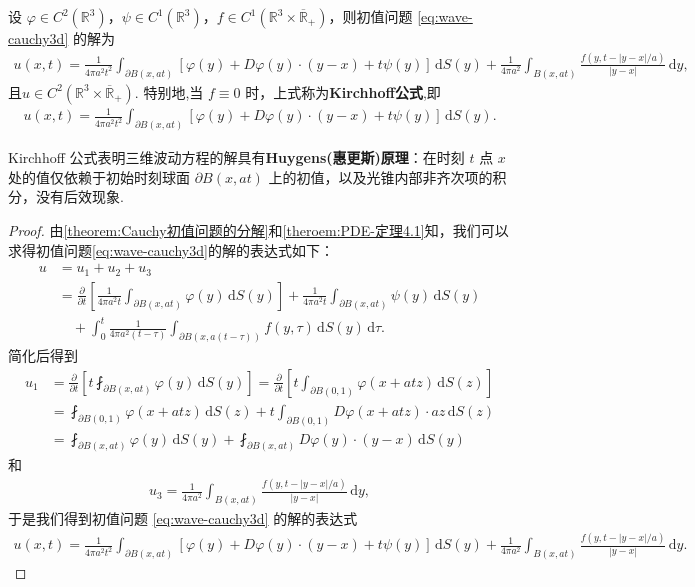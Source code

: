 \documentclass[../../main.tex]{subfiles}%
\begin{document}
\begin{theorem}\label{theorem:PDE-Kirchhoff公式}
设 $\varphi\in C^2(\mathbb{R}^3)$，$\psi\in C^1(\mathbb{R}^3)$，$f\in C^1(\mathbb{R}^3\times\overline{\mathbb{R}}_+)$，则初值问题 \eqref{eq:wave-cauchy3d} 的解为
\begin{align*}
u(x,t)=\frac{1}{4\pi a^2t^2}\int_{\partial B(x,at)}[\varphi(y)+D\varphi(y)\cdot(y-x)+t\psi(y)]\,\mathrm{d}S(y) \nonumber 
+\frac{1}{4\pi a^2}\int_{B(x,at)}\frac{f(y,t-|y-x|/a)}{|y-x|}\,\mathrm{d}y, 
\end{align*}
且$u\in C^2(\mathbb{R}^3\times\overline{\mathbb{R}}_+)$.
特别地,当 $f\equiv 0$ 时，上式称为\textbf{Kirchhoff公式},即
\begin{align}\label{eq:kirchhoff}
u(x,t)=\frac{1}{4\pi a^2t^2}\int_{\partial B(x,at)}[\varphi(y)+D\varphi(y)\cdot(y-x)+t\psi(y)]\,\mathrm{d}S(y). 
\end{align}
\end{theorem}
\begin{remark}
Kirchhoff 公式表明三维波动方程的解具有\textbf{Huygens(惠更斯)原理}：在时刻 $t$ 点 $x$ 处的值仅依赖于初始时刻球面 $\partial B(x,at)$ 上的初值，以及光锥内部非齐次项的积分，没有后效现象.
\end{remark}
\begin{proof}
由\cref{theorem:Cauchy初值问题的分解}和\cref{theroem:PDE-定理4.1}知，我们可以求得初值问题\eqref{eq:wave-cauchy3d}的解的表达式如下：
\begin{align*}
u&=u_1+u_2+u_3 \\
&=\frac{\partial}{\partial t}\left[\frac{1}{4\pi a^2t}\int_{\partial B(x,at)}\varphi(y)\,\mathrm{d}S(y)\right]+\frac{1}{4\pi a^2t}\int_{\partial B(x,at)}\psi(y)\,\mathrm{d}S(y) \\
&\quad+\int_0^t\frac{1}{4\pi a^2(t-\tau)}\int_{\partial B(x,a(t-\tau))}f(y,\tau)\,\mathrm{d}S(y)\,\mathrm{d}\tau.
\end{align*}
简化后得到
\begin{align*}
u_1&=\frac{\partial}{\partial t}\left[t\fint_{\partial B(x,at)}\varphi(y)\,\mathrm{d}S(y)\right]
=\frac{\partial}{\partial t}\left[t\int_{\partial B(0,1)}\varphi(x+atz)\,\mathrm{d}S(z)\right] \\
&=\fint_{\partial B(0,1)}\varphi(x+atz)\,\mathrm{d}S(z)+t\int_{\partial B(0,1)}D\varphi(x+atz)\cdot az\,\mathrm{d}S(z) \\
&=\fint_{\partial B(x,at)}\varphi(y)\,\mathrm{d}S(y)+\fint_{\partial B(x,at)}D\varphi(y)\cdot(y-x)\,\mathrm{d}S(y)
\end{align*}
和
\begin{align*}
u_3=\frac{1}{4\pi a^2}\int_{B(x,at)}\frac{f(y,t-|y-x|/a)}{|y-x|}\,\mathrm{d}y,
\end{align*}
于是我们得到初值问题 \eqref{eq:wave-cauchy3d} 的解的表达式
\begin{align*}
u(x,t)=\frac{1}{4\pi a^2t^2}\int_{\partial B(x,at)}[\varphi(y)+D\varphi(y)\cdot(y-x)+t\psi(y)]\,\mathrm{d}S(y) +\frac{1}{4\pi a^2}\int_{B(x,at)}\frac{f(y,t-|y-x|/a)}{|y-x|}\,\mathrm{d}y. 
\end{align*}
\end{proof}
\end{document}
